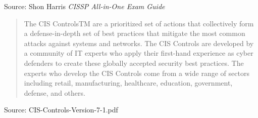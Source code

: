 \documentclass[Screen16to9,17pt]{foils}
\begin{document}


Source: Shon Harris \emph{CISSP All-in-One Exam Guide}



\begin{quote}
  The CIS ControlsTM are a prioritized set of actions that collectively form a defense-in-depth set
of best practices that mitigate the most common attacks against systems and networks. The
CIS Controls are developed by a community of IT experts who apply their first-hand experience
as cyber defenders to create these globally accepted security best practices. The experts who
develop the CIS Controls come from a wide range of sectors including retail, manufacturing,
healthcare, education, government, defense, and others.
\end{quote}

Source:  CIS-Controls-Version-7-1.pdf

\end{document}
